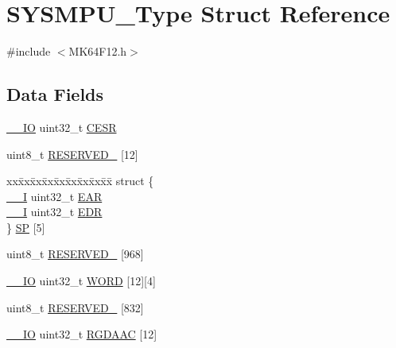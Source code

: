 \hypertarget{struct_s_y_s_m_p_u___type}{}\section{S\+Y\+S\+M\+P\+U\+\_\+\+Type Struct Reference}
\label{struct_s_y_s_m_p_u___type}


{\ttfamily \#include $<$M\+K64\+F12.\+h$>$}

\subsection*{Data Fields}
\begin{DoxyCompactItemize}
\item 
\mbox{\hyperlink{core__cm4_8h_aec43007d9998a0a0e01faede4133d6be}{\+\_\+\+\_\+\+IO}} uint32\+\_\+t \mbox{\hyperlink{group___v_r_e_f___peripheral___access___layer_gafb421388460a6f91dc5a6a192d886912}{C\+E\+SR}}
\item 
uint8\+\_\+t \mbox{\hyperlink{group___v_r_e_f___peripheral___access___layer_gaf18bafaac3b2ce682652a0ce35d863c5}{R\+E\+S\+E\+R\+V\+E\+D\+\_}} \mbox{[}12\mbox{]}
\item 
\begin{tabbing}
xx\=xx\=xx\=xx\=xx\=xx\=xx\=xx\=xx\=\kill
struct \{\\
\>\mbox{\hyperlink{core__cm4_8h_af63697ed9952cc71e1225efe205f6cd3}{\_\_I}} uint32\_t \mbox{\hyperlink{group___v_r_e_f___peripheral___access___layer_gaaafc8f097baa38e6a29b751eb0b97316}{EAR}}\\
\>\mbox{\hyperlink{core__cm4_8h_af63697ed9952cc71e1225efe205f6cd3}{\_\_I}} uint32\_t \mbox{\hyperlink{group___v_r_e_f___peripheral___access___layer_gaaec2dafc0fa1bdd2c7bd75d2eb12dbef}{EDR}}\\
\} \mbox{\hyperlink{group___v_r_e_f___peripheral___access___layer_ga580a2c7b622f8b50342faed2cfcd9fbb}{SP}} \mbox{[}5\mbox{]}\\

\end{tabbing}\item 
uint8\+\_\+t \mbox{\hyperlink{group___v_r_e_f___peripheral___access___layer_gaed973faccea151edaf3bdaa2664da441}{R\+E\+S\+E\+R\+V\+E\+D\+\_}} \mbox{[}968\mbox{]}
\item 
\mbox{\hyperlink{core__cm4_8h_aec43007d9998a0a0e01faede4133d6be}{\+\_\+\+\_\+\+IO}} uint32\+\_\+t \mbox{\hyperlink{group___v_r_e_f___peripheral___access___layer_gaa052a52bc368d47899920f359ba10ce6}{W\+O\+RD}} \mbox{[}12\mbox{]}\mbox{[}4\mbox{]}
\item 
uint8\+\_\+t \mbox{\hyperlink{group___v_r_e_f___peripheral___access___layer_ga91ced9af85b6245589cbf0d6688d5ad8}{R\+E\+S\+E\+R\+V\+E\+D\+\_}} \mbox{[}832\mbox{]}
\item 
\mbox{\hyperlink{core__cm4_8h_aec43007d9998a0a0e01faede4133d6be}{\+\_\+\+\_\+\+IO}} uint32\+\_\+t \mbox{\hyperlink{group___v_r_e_f___peripheral___access___layer_ga361969cc7784783c8fabc39826ef8afb}{R\+G\+D\+A\+AC}} \mbox{[}12\mbox{]}
\end{DoxyCompactItemize}


